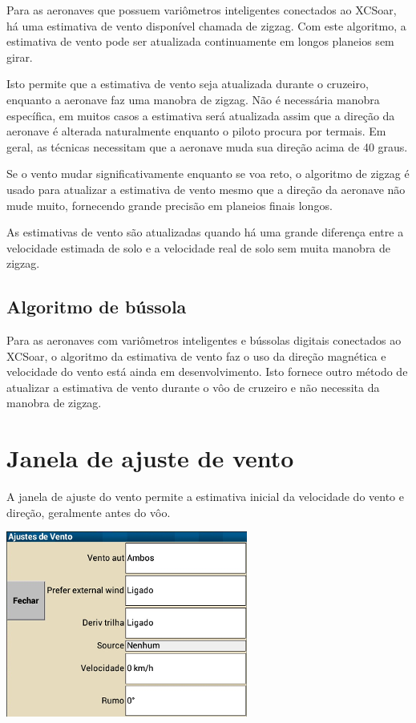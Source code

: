 Para as aeronaves que possuem variômetros inteligentes conectados ao XCSoar, há uma estimativa de vento disponível chamada de zigzag.  Com este algoritmo, a estimativa de vento pode ser atualizada continuamente em longos planeios sem girar.

Isto permite que a estimativa de vento seja atualizada durante o cruzeiro, enquanto a aeronave faz uma manobra de zigzag.  Não é necessária manobra específica, em muitos casos a estimativa será atualizada assim que a direção da aeronave é alterada naturalmente enquanto o piloto procura por termais.  Em geral, as técnicas necessitam que a aeronave muda sua direção acima de 40 graus.

Se o vento mudar significativamente enquanto se voa reto, o algoritmo de zigzag é usado para atualizar a estimativa de vento mesmo que a direção da aeronave não mude muito, fornecendo grande precisão em planeios finais longos.

As estimativas de vento são atualizadas quando há uma grande diferença entre a velocidade estimada de solo e a velocidade real de solo sem muita manobra de zigzag.


\subsection*{Algoritmo de bússola}

Para as aeronaves com variômetros inteligentes e bússolas digitais conectados ao XCSoar, o algoritmo da estimativa de vento faz o uso da direção magnética e velocidade do vento está ainda em desenvolvimento.  Isto fornece outro método de atualizar a estimativa de vento durante o vôo de cruzeiro e não necessita da manobra de zigzag.  

\section{Janela de ajuste de vento}\label{sec:wind-setup}

A janela de ajuste do vento permite a estimativa inicial da velocidade do vento e direção, geralmente antes do vôo.

\begin{center}
\includegraphics[angle=0,width=0.4\linewidth,keepaspectratio='true']{figures/dialog-wind2.png}
\end{center}

